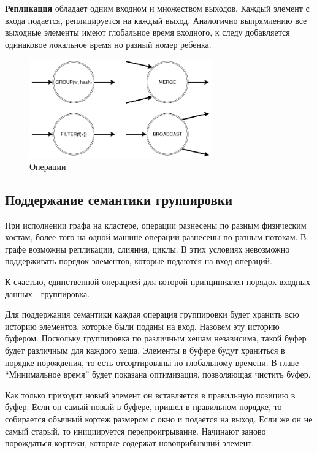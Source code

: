 \documentclass[14pt]{matmex-diploma-custom}
\begin{document}
\textbf{Репликация} обладает одним входном и множеством выходов.  Каждый элемент с входа подается, реплицируется на каждый выход. Аналогично выпрямлению все выходные элементы имеют глобальное время входного, к следу добавляется одинаковое локальное время но разный номер ребенка.

\begin{figure}
  \centering
	\includegraphics[width=0.7\textwidth]{pics/ops.png}
	\caption{Операции}
\end{figure}

\subsection{Поддержание семантики группировки}

При исполнении графа на кластере, операции разнесены по разным физическим хостам, более того на одной машине операции разнесены по разным потокам. В графе возможны репликации, слияния, циклы. В этих условиях невозможно поддерживать порядок элементов, которые подаются на вход операций.

К счастью, единственной операцией для которой принципиален порядок входных данных - группировка.

Для поддержания семантики каждая операция группировки будет хранить всю историю элементов, которые были поданы на вход. Назовем эту историю буфером. Поскольку группировка по различным хешам независима, такой буфер будет различным для каждого хеша. Элементы в буфере будут храниться в порядке порождения, то есть отсортированы по глобальному времени. В главе “Минимальное время” будет показана оптимизация, позволяющая чистить буфер.

Как только приходит новый элемент он вставляется в правильную позицию в буфер. Если он самый новый в буфере, пришел в правильном порядке, то собирается обычный кортеж размером с окно и подается на выход. Если же он не самый старый, то инициируется перепроигрывание. Начинают заново порождаться кортежи, которые содержат новоприбывший элемент.
\end{document}
